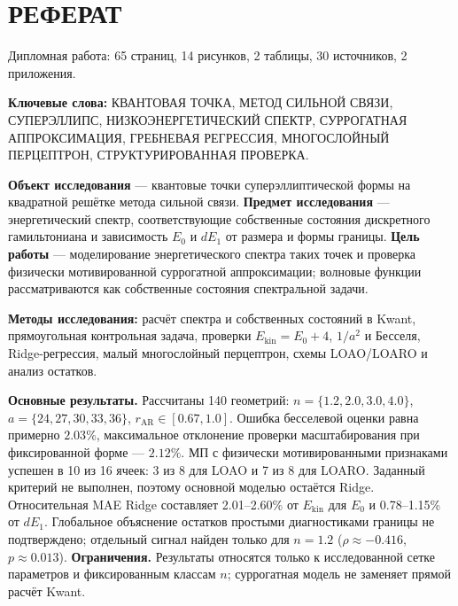 \chapter*{РЕФЕРАТ}
\vspace{-1cm}

Дипломная работа: 65 страниц, 14 рисунков, 2 таблицы, 30 источников, 2 приложения.

\textbf{Ключевые слова:} КВАНТОВАЯ ТОЧКА, МЕТОД СИЛЬНОЙ СВЯЗИ, СУПЕРЭЛЛИПС,
НИЗКОЭНЕРГЕТИЧЕСКИЙ СПЕКТР, СУРРОГАТНАЯ АППРОКСИМАЦИЯ,
ГРЕБНЕВАЯ РЕГРЕССИЯ, МНОГОСЛОЙНЫЙ ПЕРЦЕПТРОН,
СТРУКТУРИРОВАННАЯ ПРОВЕРКА.\par

\textbf{Объект исследования} --- квантовые точки суперэллиптической формы на квадратной решётке метода сильной связи. \textbf{Предмет исследования} --- энергетический спектр, соответствующие собственные состояния дискретного гамильтониана и зависимость \(E_0\) и \(dE_1\) от размера и формы границы. \textbf{Цель работы} --- моделирование энергетического спектра таких точек и проверка физически мотивированной суррогатной аппроксимации; волновые функции рассматриваются как собственные состояния спектральной задачи.

\textbf{Методы исследования:} расчёт спектра и собственных состояний в Kwant, прямоугольная контрольная задача, проверки \(E_{\mathrm{kin}}=E_0+4\), \(1/a^2\) и Бесселя, Ridge-регрессия, малый многослойный перцептрон, схемы LOAO/LOARO и анализ остатков.

\textbf{Основные результаты.} Рассчитаны 140 геометрий: \(n=\{1.2,2.0,3.0,4.0\}\), \(a=\{24,27,30,33,36\}\), \(r_{\mathrm{AR}}\in[0.67,1.0]\). Ошибка бесселевой оценки равна примерно \(2.03\%\), максимальное отклонение проверки масштабирования при фиксированной форме --- \(2.12\%\). МП с физически мотивированными признаками успешен в 10 из 16 ячеек: 3 из 8 для LOAO и 7 из 8 для LOARO. Заданный критерий не выполнен, поэтому основной моделью остаётся Ridge. Относительная MAE Ridge составляет 2.01--2.60\% от \(E_{\mathrm{kin}}\) для \(E_0\) и 0.78--1.15\% от \(dE_1\). Глобальное объяснение остатков простыми диагностиками границы не подтверждено; отдельный сигнал найден только для \(n=1.2\) (\(\rho\approx -0.416\), \(p\approx0.013\)). \textbf{Ограничения.} Результаты относятся только к исследованной сетке параметров и фиксированным классам \(n\); суррогатная модель не заменяет прямой расчёт Kwant.
\par

